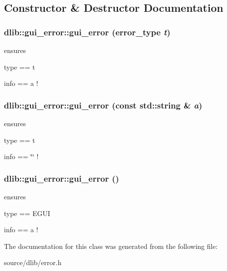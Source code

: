 \subsection{Constructor \& Destructor Documentation}
\hypertarget{classdlib_1_1gui__error_a79df44246d54d45905564cabd8ea0a6e}{
\subsubsection[{gui\_\-error}]{\setlength{\rightskip}{0pt plus 5cm}dlib::gui\_\-error::gui\_\-error (error\_\-type {\em t})}}
\label{classdlib_1_1gui__error_a79df44246d54d45905564cabd8ea0a6e}
ensures
\begin{DoxyItemize}
\item type == t
\item info == a ! 
\end{DoxyItemize}\hypertarget{classdlib_1_1gui__error_a695fa7a02393b2154db455350fc9ab9c}{
\subsubsection[{gui\_\-error}]{\setlength{\rightskip}{0pt plus 5cm}dlib::gui\_\-error::gui\_\-error (const std::string \& {\em a})}}
\label{classdlib_1_1gui__error_a695fa7a02393b2154db455350fc9ab9c}
ensures
\begin{DoxyItemize}
\item type == t
\item info == \char`\"{}\char`\"{} ! 
\end{DoxyItemize}\hypertarget{classdlib_1_1gui__error_a12b91b87302cdcb3e727f4970b1f8453}{
\subsubsection[{gui\_\-error}]{\setlength{\rightskip}{0pt plus 5cm}dlib::gui\_\-error::gui\_\-error ()}}
\label{classdlib_1_1gui__error_a12b91b87302cdcb3e727f4970b1f8453}
ensures
\begin{DoxyItemize}
\item type == EGUI
\item info == a ! 
\end{DoxyItemize}

The documentation for this class was generated from the following file:\begin{DoxyCompactItemize}
\item 
source/dlib/error.h\end{DoxyCompactItemize}
